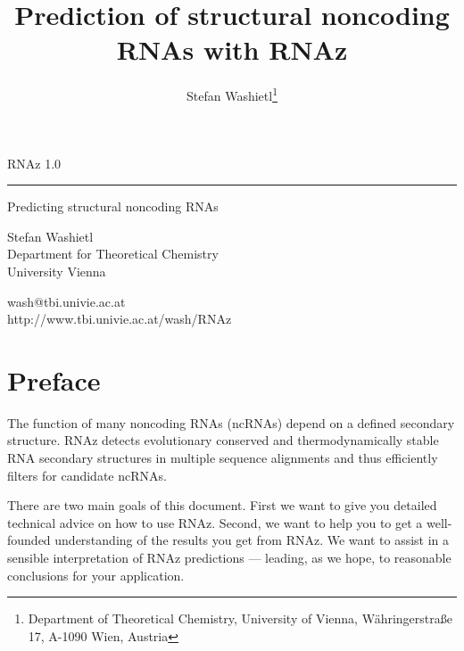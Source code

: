 \documentclass[11pt]{article}
\begin{document}
\title{Prediction of structural noncoding RNAs with RNAz} 
\author{Stefan Washietl\footnote{Department of Theoretical Chemistry, University of
  Vienna, W{\"a}hringerstra{\ss}e 17, A-1090 Wien, Austria}} 

\thispagestyle{empty}

\vspace*{5cm}

\huge 
\sf

RNAz 1.0

\vspace*{-0.8cm}
\rule{\textwidth}{1mm}

\large
\vspace*{-0.3cm}
\hfill Predicting structural noncoding RNAs

\vspace{3cm}

\vfill

Stefan Washietl\\Department for Theoretical
Chemistry\\University Vienna

wash@tbi.univie.ac.at\\
http://www.tbi.univie.ac.at/\raisebox{-0.9ex}{\~{ }}wash/RNAz

\normalfont

\newpage


\tableofcontents

\newpage


\section*{Preface}

The function of many noncoding RNAs (ncRNAs) depend on a defined secondary
structure. RNAz detects evolutionary conserved and thermodynamically stable
RNA secondary structures in multiple sequence alignments and thus
efficiently filters for candidate ncRNAs.

There are two main goals of this document. First we want to give you
detailed technical advice on how to use RNAz. Second, we want to help you
to get a well-founded understanding of the results you get from RNAz. We
want to assist in a sensible interpretation of RNAz predictions ---
leading, as we hope, to reasonable conclusions for your application.
\end{document}

